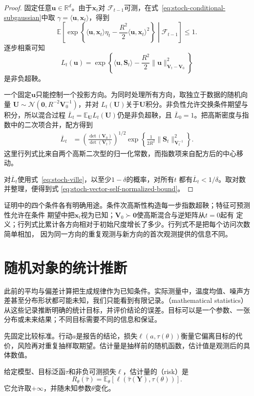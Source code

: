 \begin{proof}
固定任意$\bm{u}\in\mathbb{R}^d$。由于$\bm{x}_t$对
$\mathcal{F}_{t-1}$可测，在式~\eqref{eq:stoch-conditional-subgaussian}中取
$\gamma=\langle\bm{u},\bm{x}_t\rangle$，得到
\[
  \mathbb{E}\!\left[
    \exp\left\{
      \langle\bm{u},\bm{x}_t\rangle\eta_t
      -\frac{R^2}{2}
       \langle\bm{u},\bm{x}_t\rangle^2
    \right\}
    \middle|\mathcal{F}_{t-1}
  \right]
  \leq1.
  \]
逐步相乘可知
\[
  L_t(\bm{u})
  =
  \exp\left\{
    \langle\bm{u},\bm{S}_t\rangle
    -\frac{R^2}{2}
     \lVert\bm{u}\rVert_{\bm{V}_t-\bm{V}_0}^2
  \right\}
\]
是非负超鞅。

一个固定$\bm{u}$只能控制一个投影方向。为同时处理所有方向，取独立于数据的随机向量
$\bm{U}\sim\mathcal{N}(\bm{0},R^{-2}\bm{V}_0^{-1})$，并对
$L_t(\bm{U})$关于$\bm{U}$积分。非负性允许交换条件期望与积分，所以混合过程
$\overline L_t=\mathbb{E}_{\bm{U}}L_t(\bm{U})$仍是非负超鞅，且
$\overline L_0=1$。把高斯密度与指数中的二次项合并，配方得到
\begin{align*}
  \overline L_t
  &=
  \left(
    \frac{\det(\bm{V}_0)}
         {\det(\bm{V}_t)}
  \right)^{1/2}
  \exp\left\{
    \frac{1}{2R^2}
    \lVert\bm{S}_t\rVert_{\bm{V}_t^{-1}}^2
  \right\}.
\end{align*}
这里行列式比来自两个高斯二次型的归一化常数，而指数项来自配方后的中心移动。

对$\overline L_t$使用式~\eqref{eq:stoch-ville}，以至少$1-\delta$的概率，对所有$t$
都有$\overline L_t<1/\delta$。取对数并整理，便得到式
\eqref{eq:stoch-vector-self-normalized-bound}。
\end{proof}

证明中的四个条件各有明确用途。条件次高斯性构造每一步指数超鞅；特征可预测性允许在条件
期望中把$\bm{x}_t$视为已知；$\bm{V}_0\succ\bm{0}$使高斯混合与逆矩阵从$t=0$起有
定义；行列式比累计各方向相对于初始尺度增长了多少。行列式不是把每个访问次数简单相加，
因为同一方向的重复观测与新方向的首次观测提供的信息不同。

\section{随机对象的统计推断}
\label{sec:rv-inference}
此前的平均与偏差计算把生成规律作为已知条件。实际测量中，温度均值、噪声方差甚至分布形状都可能未知，我们只能看到有限记录。（mathematical statistics）从这些记录推断明确的统计目标，并评价结论的误差。目标可以是一个参数、一张分布或未来结果；不同目标需要不同的信息和保证。

先固定比较标准。行动\(a\)是报告的结论，损失\(\ell(a,\tau(\theta))\)衡量它偏离目标的代价，风险再对重复抽样取期望。估计量是抽样前的随机函数，估计值是观测后的具体数值。
\begin{definition}[估计量的风险]
  \label{def:statistics-estimator-risk}
给定模型、目标泛函\(\tau\)和非负可测损失\(\ell\)，估计量的（risk）是
\[
  R_\theta(\widehat\tau)
  =\mathbb{E}_\theta[
    \ell(\widehat\tau(\bm Y),\tau(\theta))].
\]
它允许取\(+\infty\)，并随未知参数\(\theta\)变化。
\end{definition}

